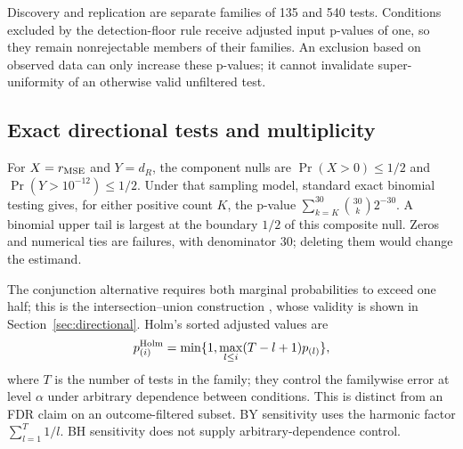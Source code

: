 Discovery and replication are separate families of 135 and 540 tests. Conditions excluded by the detection-floor rule receive adjusted input p-values of one, so they remain nonrejectable members of their families. An exclusion based on observed data can only increase these p-values; it cannot invalidate super-uniformity of an otherwise valid unfiltered test.

\subsection{Exact directional tests and multiplicity}
For $X=r_{\operatorname{MSE}}$ and $Y=d_R$, the component nulls are $\Pr(X>0)\le1/2$ and $\Pr(Y>10^{-12})\le1/2$. Under that sampling model, standard exact binomial testing \citep{LehmannRomano2005} gives, for either positive count $K$, the p-value $\sum_{k=K}^{30}\binom{30}{k}2^{-30}$. A binomial upper tail is largest at the boundary $1/2$ of this composite null. Zeros and numerical ties are failures, with denominator 30; deleting them would change the estimand.

The conjunction alternative requires both marginal probabilities to exceed one half; this is the intersection--union construction \citep{Berger1982IUT}, whose validity is shown in Section~\ref{sec:directional}. Holm's sorted adjusted values \citep{Holm1979} are
\[
 p^{\rm Holm}_{(i)}=\min\{1,\max_{l\le i}(T-l+1)p_{(l)}\},
\]
where $T$ is the number of tests in the family; they control the familywise error at level $\alpha$ under arbitrary dependence between conditions. This is distinct from an FDR claim on an outcome-filtered subset. BY sensitivity \citep{BenjaminiYekutieli2001} uses the harmonic factor $\sum_{l=1}^T1/l$. BH sensitivity \citep{BenjaminiHochberg1995} does not supply arbitrary-dependence control.

